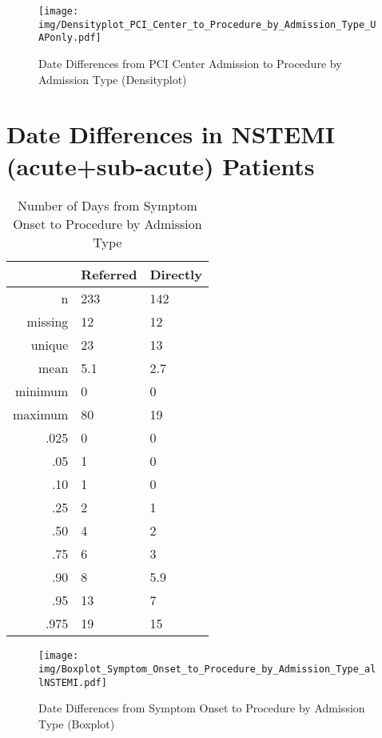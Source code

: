 \documentclass[presentation,xcolor=pdftex,dvipsnames,table,11pt]{beamer}
\begin{document}
\begin{tiny}
\begin{frame}
\begin{figure}
  \centering
  \caption{Date Differences from PCI Center Admission to Procedure by Admission Type (Densityplot)}
  \label{Density: Date Differences from PCI Center Admission to Procedure by Admission Type}
\texttt{[image: img/Densityplot\_PCI\_Center\_to\_Procedure\_by\_Admission\_Type\_UAPonly.pdf]}\end{figure}
\end{frame}





\section{Date Differences in NSTEMI (acute+sub-acute) Patients}

\begin{table}[ht]
\centering
\begin{tabular}{rll}
  \toprule
 & Referred & Directly \\ 
  \midrule
n & 233 & 142 \\ 
  missing & 12 & 12 \\ 
  unique & 23 & 13 \\ 
  mean & 5.1 & 2.7 \\ 
  minimum & 0 & 0 \\ 
  maximum & 80 & 19 \\ 
  .025 & 0 & 0 \\ 
  .05 & 1 & 0 \\ 
  .10 & 1 & 0 \\ 
  .25 & 2 & 1 \\ 
  .50 & 4 & 2 \\ 
  .75 & 6 & 3 \\ 
  .90 & 8 & 5.9 \\ 
  .95 & 13 & 7 \\ 
  .975 & 19 & 15 \\ 
   \bottomrule
\end{tabular}
\caption{Number of Days from Symptom Onset to Procedure by Admission Type} 
\end{table}
\begin{frame}
\begin{figure}
  \centering
  \caption{Date Differences from Symptom Onset to Procedure by Admission Type (Boxplot)}
  \label{Boxplot: Date Differences from Symptom Onset to Procedure by Admission Type}
\texttt{[image: img/Boxplot\_Symptom\_Onset\_to\_Procedure\_by\_Admission\_Type\_allNSTEMI.pdf]}\end{figure}
\end{frame}



\end{tiny}
\end{document}
